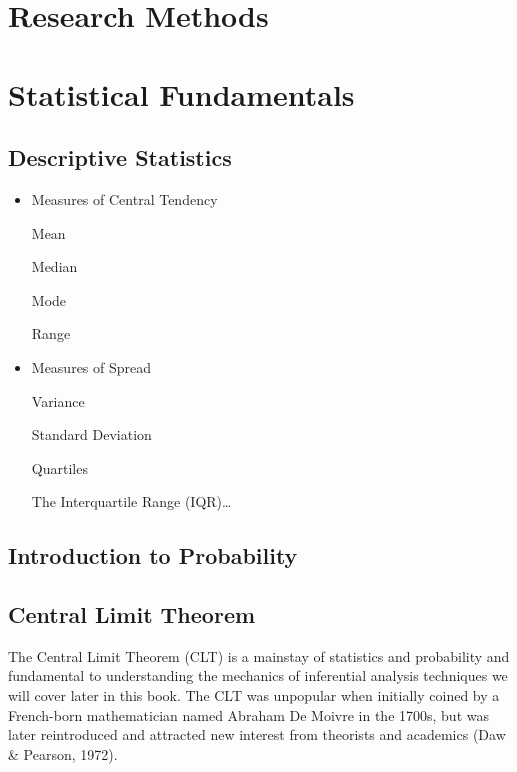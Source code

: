 \documentclass[]{book}
\begin{document}
\hypertarget{research-methods}{%
\chapter{Research Methods}\label{research-methods}}

\hypertarget{statistical-fundamentals}{%
\chapter{Statistical Fundamentals}\label{statistical-fundamentals}}

\hypertarget{descriptive-statistics}{%
\section{Descriptive Statistics}\label{descriptive-statistics}}

\begin{itemize}
\item
  Measures of Central Tendency

  Mean

  Median

  Mode

  Range
\item
  Measures of Spread

  Variance

  Standard Deviation

  Quartiles

  The Interquartile Range (IQR)\ldots{}
\end{itemize}

\hypertarget{introduction-to-probability}{%
\section{Introduction to Probability}\label{introduction-to-probability}}

\hypertarget{central-limit-theorem}{%
\section{Central Limit Theorem}\label{central-limit-theorem}}

The Central Limit Theorem (CLT) is a mainstay of statistics and probability and fundamental to understanding the mechanics of inferential analysis techniques we will cover later in this book. The CLT was unpopular when initially coined by a French-born mathematician named Abraham De Moivre in the 1700s, but was later reintroduced and attracted new interest from theorists and academics (Daw \& Pearson, 1972).
\end{document}

